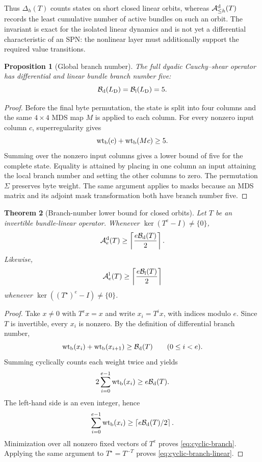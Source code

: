 \documentclass[10pt,reqno]{amsart}
\theoremstyle{plain}
\newtheorem{theorem}{Theorem}[section]
\newtheorem{proposition}[theorem]{Proposition}
\theoremstyle{remark}\newtheorem{remark}[theorem]{Remark}
\theoremstyle{definition}\newtheorem{definition}[theorem]{Definition}
\newcommand{\wt}{\operatorname{wt}}
\begin{document}
Thus $\Delta_h(T)$ counts states on short closed linear orbits, whereas $\mathcal A_{\le h}^{\rm d}(T)$ records the least cumulative number of active bundles on such an orbit. The invariant is exact for the isolated linear dynamics and is not yet a differential characteristic of an SPN: the nonlinear layer must additionally support the required value transitions.

\begin{proposition}[Global branch number]\label{prop:global-branch}
The full dyadic Cauchy--shear operator has differential and linear bundle branch number five:
\[
\mathcal B_{\rm d}(L_{\mathrm{D}})=\mathcal B_{\rm l}(L_{\mathrm{D}})=5.
\]
\end{proposition}
\begin{proof}
Before the final byte permutation, the state is split into four columns and the same $4\times4$ MDS map $M$ is applied to each column. For every nonzero input column $c$, superregularity gives
\[
\wt_{\rm b}(c)+\wt_{\rm b}(Mc)\ge5.
\]
Summing over the nonzero input columns gives a lower bound of five for the complete state. Equality is attained by placing in one column an input attaining the local branch number and setting the other columns to zero. The permutation $\Sigma$ preserves byte weight. The same argument applies to masks because an MDS matrix and its adjoint mask transformation both have branch number five. \end{proof}

\begin{theorem}[Branch-number lower bound for closed orbits]\label{thm:cyclic-branch-bound}
Let $T$ be an invertible bundle-linear operator. Whenever $\ker(T^e-I)\ne\{0\}$,
\begin{equation}
\mathcal A_e^{\rm d}(T)
\ge
\left\lceil\frac{e\mathcal B_{\rm d}(T)}{2}\right\rceil.
\label{eq:cyclic-branch}
\end{equation}
Likewise,
\begin{equation}
\mathcal A_e^{\rm l}(T)
\ge
\left\lceil\frac{e\mathcal B_{\rm l}(T)}{2}\right\rceil
\label{eq:cyclic-branch-linear}
\end{equation}
whenever $\ker((T^\star)^e-I)\ne\{0\}$.
\end{theorem}
\begin{proof}
Take $x\ne0$ with $T^e x=x$ and write $x_i=T^i x$, with indices modulo $e$. Since $T$ is invertible, every $x_i$ is nonzero. By the definition of differential branch number,
\[
\wt_{\rm b}(x_i)+\wt_{\rm b}(x_{i+1})\ge\mathcal B_{\rm d}(T)
\qquad(0\le i<e).
\]
Summing cyclically counts each weight twice and yields
\[
2\sum_{i=0}^{e-1}\wt_{\rm b}(x_i)\ge e\mathcal B_{\rm d}(T).
\]
The left-hand side is an even integer, hence
\[
\sum_{i=0}^{e-1}\wt_{\rm b}(x_i)
\ge\left\lceil e\mathcal B_{\rm d}(T)/2\right\rceil.
\]
Minimization over all nonzero fixed vectors of $T^e$ proves \eqref{eq:cyclic-branch}. Applying the same argument to $T^\star=T^{-T}$ proves \eqref{eq:cyclic-branch-linear}. \end{proof}
\end{document}
